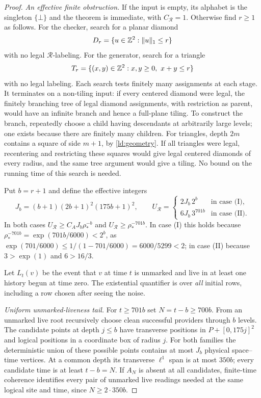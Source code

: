 \begin{proof}
\emph{An effective finite obstruction.}
If the input is empty, its alphabet is the singleton $\{\bot\}$ and the theorem is immediate, with $C_{\mathcal R}=1$. Otherwise find $r\ge1$ as follows. For the checker, search for a planar diamond
\[
 D_r=\{u\in\mathbb{Z}^2:\|u\|_1\le r\}
\]
with no legal $\mathcal R$-labeling. For the generator, search for a triangle
\[
 T_r=\{(x,y)\in\mathbb{Z}^2:x,y\ge0,\ x+y\le r\}
\]
with no legal labeling. Each search tests finitely many assignments at each stage. It terminates on a non-tiling input: if every centered diamond were legal, the finitely branching tree of legal diamond assignments, with restriction as parent, would have an infinite branch and hence a full-plane tiling. To construct the branch, repeatedly choose a child having descendants at arbitrarily large levels; one exists because there are finitely many children. For triangles, depth $2m$ contains a square of side $m+1$, by \cref{ld:geometry}. If all triangles were legal, recentering and restricting these squares would give legal centered diamonds of every radius, and the same tree argument would give a tiling. No bound on the running time of this search is needed.

Put $b=r+1$ and define the effective integers
\[
  J_b=(b+1)(2b+1)^2(175b+1)^2,\qquad
  U_{\mathcal R}=\begin{cases}2J_b\,2^b&\text{in case (I)},\\ 6J_b\,3^{701b}&\text{in case (II)}.\end{cases}
\]
In both cases $U_{\mathcal R}\ge C_AJ_b\rho_*^{-b}$ and $U_{\mathcal R}\ge\rho_*^{-701b}$. In case (I) this holds because
$\rho_*^{-701b}=\exp(701b/6000)<2^b$, as $\exp(701/6000)\le1/(1-701/6000)=6000/5299<2$; in case (II)
because $3>\exp(1)$ and $6>16/3$.

Let $L_t(v)$ be the event that $v$ at time $t$ is unmarked and live in at least one history begun at time zero. The existential quantifier is over \emph{all} initial rows, including a row chosen after seeing the noise.

\emph{Uniform unmarked-liveness tail.}
For $t\ge701b$ set $N=t-b\ge700b$. From an unmarked live root recursively choose clean successful providers through $b$ levels. The candidate points at depth $j\le b$ have transverse positions in $P+[0,175j]^2$ and logical positions in a coordinate box of radius $j$. For both families the deterministic union of these possible points contains at most $J_b$ physical space--time vertices. At a common depth its transverse $\ell^1$ span is at most $350b$; every candidate time is at least $t-b=N$. If $A_N$ is absent at all candidates, finite-time coherence identifies every pair of unmarked live readings needed at the same logical site and time, since $N\ge2\cdot350b$.


\end{proof}
